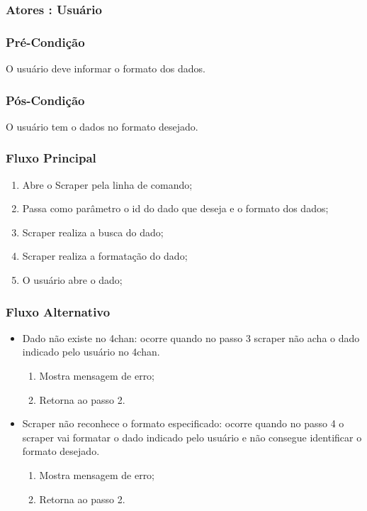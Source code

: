 \subsubsection{Atores : Usuário}
\subsubsection{Pré-Condição}
O usuário deve informar o formato dos dados.
\subsubsection{Pós-Condição}
O usuário tem o dados no formato desejado.
\subsubsection{Fluxo Principal}
\begin{enumerate}
    \item Abre o Scraper pela linha de comando;
    \item Passa como parâmetro o id do dado que deseja e o formato dos dados;
    \item Scraper realiza a busca do dado;
    \item Scraper realiza a formatação do dado;
    \item O usuário abre o dado;
\end{enumerate}
\subsubsection{Fluxo Alternativo}
\begin{itemize}
    \item Dado não existe no 4chan: ocorre quando no passo 3 scraper não acha o dado indicado pelo usuário no 4chan.
    \begin{enumerate}
        \item Mostra mensagem de erro;
        \item Retorna ao passo 2.
    \end{enumerate}
    \item Scraper não reconhece o formato especificado: ocorre quando no passo 4 o scraper vai formatar o dado indicado pelo usuário e não consegue identificar o formato desejado.
    \begin{enumerate}
        \item Mostra mensagem de erro;
        \item Retorna ao passo 2.
    \end{enumerate}
\end{itemize}


